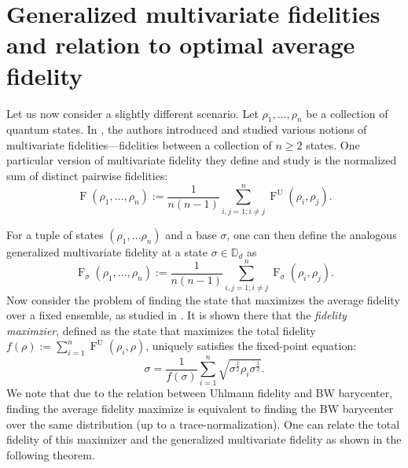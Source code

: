 \documentclass[12pt]{article}
\theoremstyle{definition}
\newcommand{\Fg}[3]{\operatorname{F}_{#3}\!\left(#1, #2\right)}
\newcommand{\Fu}[2]{\operatorname{F}^\mathrm{U}\!\left(#1, #2\right)}
\begin{document}
\section{Generalized multivariate fidelities and relation to optimal average fidelity } \label{Sec:Multivariate}
Let us now consider a slightly different scenario. Let ${\rho_1, \dots, \rho_n}$ be a collection of quantum states. In \cite{Wilde2024multivariate}, the authors introduced and studied various notions of multivariate fidelities—fidelities between a collection of $n \geq 2$ states. One particular version of multivariate fidelity they define and study is the normalized sum of distinct pairwise fidelities:
\begin{equation} 
  \operatorname{F}(\rho_1, \ldots, \rho_n) := \frac1{n(n-1)} \sum_{i,j=1; i \neq j}^n \Fu{\rho_i}{\rho_j}.   
\end{equation}



For a tuple of states $(\rho_1, \ldots \rho_n)$ and a base $\sigma$, one can then define the analogous generalized multivariate fidelity at a state $\sigma \in \mathbb D_d$ as
\begin{equation}
    \operatorname{F}_\sigma(\rho_1, \ldots, \rho_n) := \frac1{n(n-1)} \sum_{i,j=1; i \neq j}^n \Fg{\rho_i}{\rho_j}{\sigma}.   
\end{equation}
Now consider the problem of finding the state that maximizes the average fidelity over a fixed ensemble, as studied in \cite{afham2022}. It is shown there that the \textit{fidelity maximzier}, defined as the state that maximizes the total fidelity $f(\rho):= \sum_{i=1}^{n} \Fu{\rho_i}{\rho}$, uniquely satisfies the fixed-point equation:
\begin{equation} \label{Eq:FPEqn}
    \sigma = \frac{1}{f(\sigma)} \sum_{i=1}^{n} \sqrt{\sigma ^{\frac12} \rho_i \sigma^{\frac12} }.
\end{equation}
We note that due to the relation between Uhlmann fidelity and BW barycenter, finding the average fidelity maximize is equivalent to finding the BW barycenter over the same distribution (up to a trace-normalization). One can relate the total fidelity of this maximizer and the generalized multivariate fidelity as shown in the following theorem.
\end{document}
